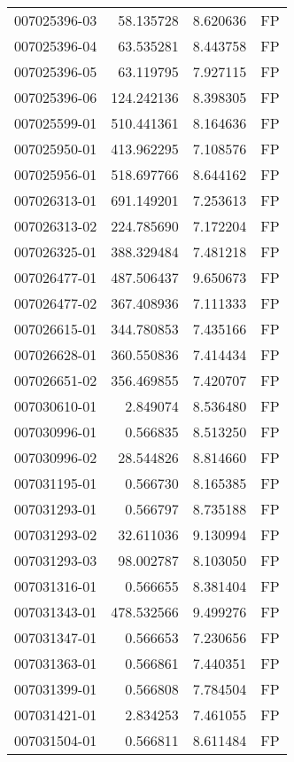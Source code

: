 \begin{tabular}{lrrl}
007025396-03 &   58.135728 &     8.620636 &   FP \\
007025396-04 &   63.535281 &     8.443758 &   FP \\
007025396-05 &   63.119795 &     7.927115 &   FP \\
007025396-06 &  124.242136 &     8.398305 &   FP \\
007025599-01 &  510.441361 &     8.164636 &   FP \\
007025950-01 &  413.962295 &     7.108576 &   FP \\
007025956-01 &  518.697766 &     8.644162 &   FP \\
007026313-01 &  691.149201 &     7.253613 &   FP \\
007026313-02 &  224.785690 &     7.172204 &   FP \\
007026325-01 &  388.329484 &     7.481218 &   FP \\
007026477-01 &  487.506437 &     9.650673 &   FP \\
007026477-02 &  367.408936 &     7.111333 &   FP \\
007026615-01 &  344.780853 &     7.435166 &   FP \\
007026628-01 &  360.550836 &     7.414434 &   FP \\
007026651-02 &  356.469855 &     7.420707 &   FP \\
007030610-01 &    2.849074 &     8.536480 &   FP \\
007030996-01 &    0.566835 &     8.513250 &   FP \\
007030996-02 &   28.544826 &     8.814660 &   FP \\
007031195-01 &    0.566730 &     8.165385 &   FP \\
007031293-01 &    0.566797 &     8.735188 &   FP \\
007031293-02 &   32.611036 &     9.130994 &   FP \\
007031293-03 &   98.002787 &     8.103050 &   FP \\
007031316-01 &    0.566655 &     8.381404 &   FP \\
007031343-01 &  478.532566 &     9.499276 &   FP \\
007031347-01 &    0.566653 &     7.230656 &   FP \\
007031363-01 &    0.566861 &     7.440351 &   FP \\
007031399-01 &    0.566808 &     7.784504 &   FP \\
007031421-01 &    2.834253 &     7.461055 &   FP \\
007031504-01 &    0.566811 &     8.611484 &   FP \\

\end{tabular}
